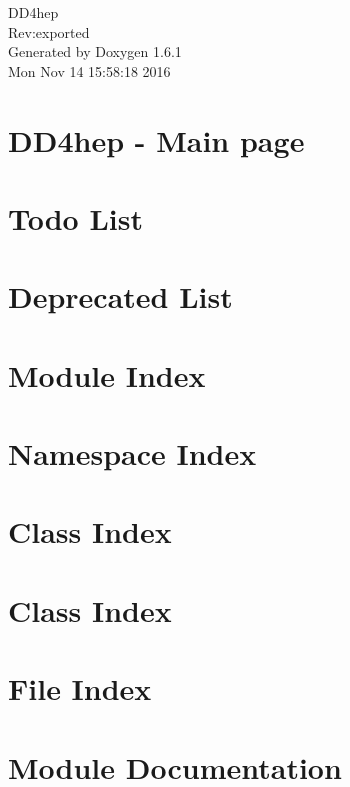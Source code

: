 \documentclass[a4paper]{book}
\begin{document}
\hypersetup{pageanchor=false}
\begin{titlepage}
\vspace*{7cm}
\begin{center}
{\Large DD4hep \\[1ex]\large Rev:exported }\\
\vspace*{1cm}
{\large Generated by Doxygen 1.6.1}\\
\vspace*{0.5cm}
{\small Mon Nov 14 15:58:18 2016}\\
\end{center}
\end{titlepage}
\clearemptydoublepage
{}
\tableofcontents
\clearemptydoublepage
{}
\hypersetup{pageanchor=true}
\chapter{DD4hep -\/ Main page}
\label{index}\hypertarget{index}{}
\chapter{Todo List}
\label{todo}
\hypertarget{todo}{}

\chapter{Deprecated List}
\label{deprecated}
\hypertarget{deprecated}{}

\chapter{Module Index}

\chapter{Namespace Index}

\chapter{Class Index}

\chapter{Class Index}

\chapter{File Index}

\chapter{Module Documentation}
















\end{document}
